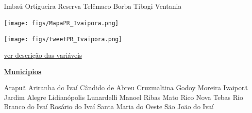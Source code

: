 \documentclass[10pt]{article} %
\begin{document}
\begin{minipage}[t]{.30\linewidth}
\begin{mdframed}[style=sidebar,frametitle={}]
\begin{itemize}
\gsquare Imbaú 
\gsquare Ortigueira 
\gsquare Reserva 
\gsquare Telêmaco Borba 
\gsquare Tibagi 
\gsquare Ventania 
\end{itemize}\BackToContents\end{mdframed}\hfill\end{minipage}\newpage\begin{minipage}[t]{.66\linewidth}
\hypertarget{Ivpr}{}
\texttt{[image: figs/MapaPR\_Ivaipora.png]}\vspace{0.5cm}\vspace{0.5cm}\begin{center}
\texttt{[image: figs/tweetPR\_Ivaipora.png]}\end{center}
\begin{center}

\end{center}
\small{\hyperlink{vartab}{ver descrição das variáveis}}\end{minipage}\hfill\begin{minipage}[t]{.30\linewidth}
\begin{mdframed}[style=sidebar,frametitle={}]
\textbf{\hyperlink{municips}{Municipios}}\begin{itemize}\gsquare Arapuã 
\gsquare Ariranha do Ivaí 
\gsquare Cândido de Abreu 
\gsquare Cruzmaltina 
\gsquare Godoy Moreira 
\gsquare Ivaiporã 
\gsquare Jardim Alegre 
\gsquare Lidianópolis 
\gsquare Lunardelli 
\gsquare Manoel Ribas 
\gsquare Mato Rico 
\gsquare Nova Tebas 
\gsquare Rio Branco do Ivaí 
\gsquare Rosário do Ivaí 
\gsquare Santa Maria do Oeste 
\gsquare São João do Ivaí 
\end{itemize}\BackToContents\end{mdframed}\hfill\end{minipage}\newpage


 
      \hypertarget{municips}{}
\end{document}

